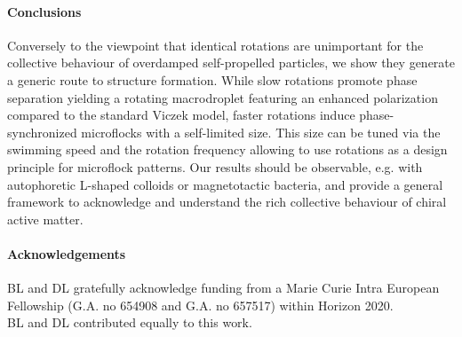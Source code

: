 \documentclass[aps,twocolumn,showlabels,showrefs,amsmath,amssymb,pre,superscriptaddress, floatfix, colors]{revtex4}
\newcommand{\1}{\begin{equation}}
\newcommand{\2}{\end{equation}}
\newcommand{\4}[2]{{\frac{#1}{#2}}}
\begin{document}
\paragraph*{Conclusions} 
Conversely to the viewpoint
that identical rotations are unimportant for the collective behaviour of overdamped self-propelled particles, 
we show they generate a generic route to structure formation. 
While slow rotations promote phase separation yielding a 
rotating macrodroplet featuring an enhanced polarization compared to the standard Viczek model, faster 
rotations induce phase-synchronized microflocks with a self-limited size.
This size can be 
tuned via the swimming speed and the rotation frequency allowing to use rotations as a design principle for microflock patterns. 
Our results should be observable, e.g. with autophoretic L-shaped colloids or magnetotactic bacteria, and
provide a general framework to acknowledge and understand the rich collective behaviour of chiral active matter. 

\paragraph*{Acknowledgements}
BL and DL gratefully acknowledge funding from a Marie Curie Intra European Fellowship (G.A. no 654908 and G.A. no 657517) within Horizon 2020.
\\BL and DL contributed equally to this work. 
\end{document}
